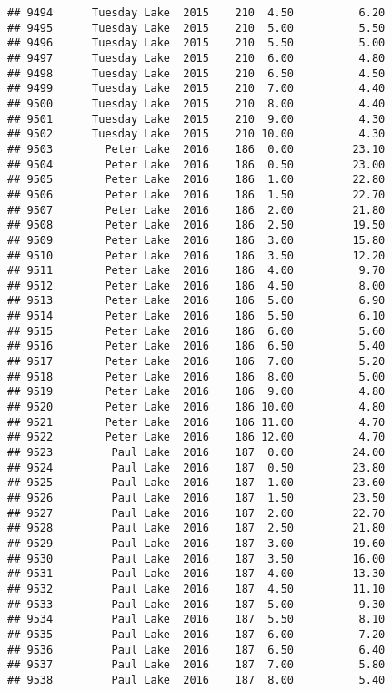 \documentclass[
]{article}
\begin{document}
\begin{verbatim}
## 9494      Tuesday Lake  2015    210  4.50          6.20
## 9495      Tuesday Lake  2015    210  5.00          5.50
## 9496      Tuesday Lake  2015    210  5.50          5.00
## 9497      Tuesday Lake  2015    210  6.00          4.80
## 9498      Tuesday Lake  2015    210  6.50          4.50
## 9499      Tuesday Lake  2015    210  7.00          4.40
## 9500      Tuesday Lake  2015    210  8.00          4.40
## 9501      Tuesday Lake  2015    210  9.00          4.30
## 9502      Tuesday Lake  2015    210 10.00          4.30
## 9503        Peter Lake  2016    186  0.00         23.10
## 9504        Peter Lake  2016    186  0.50         23.00
## 9505        Peter Lake  2016    186  1.00         22.80
## 9506        Peter Lake  2016    186  1.50         22.70
## 9507        Peter Lake  2016    186  2.00         21.80
## 9508        Peter Lake  2016    186  2.50         19.50
## 9509        Peter Lake  2016    186  3.00         15.80
## 9510        Peter Lake  2016    186  3.50         12.20
## 9511        Peter Lake  2016    186  4.00          9.70
## 9512        Peter Lake  2016    186  4.50          8.00
## 9513        Peter Lake  2016    186  5.00          6.90
## 9514        Peter Lake  2016    186  5.50          6.10
## 9515        Peter Lake  2016    186  6.00          5.60
## 9516        Peter Lake  2016    186  6.50          5.40
## 9517        Peter Lake  2016    186  7.00          5.20
## 9518        Peter Lake  2016    186  8.00          5.00
## 9519        Peter Lake  2016    186  9.00          4.80
## 9520        Peter Lake  2016    186 10.00          4.80
## 9521        Peter Lake  2016    186 11.00          4.70
## 9522        Peter Lake  2016    186 12.00          4.70
## 9523         Paul Lake  2016    187  0.00         24.00
## 9524         Paul Lake  2016    187  0.50         23.80
## 9525         Paul Lake  2016    187  1.00         23.60
## 9526         Paul Lake  2016    187  1.50         23.50
## 9527         Paul Lake  2016    187  2.00         22.70
## 9528         Paul Lake  2016    187  2.50         21.80
## 9529         Paul Lake  2016    187  3.00         19.60
## 9530         Paul Lake  2016    187  3.50         16.00
## 9531         Paul Lake  2016    187  4.00         13.30
## 9532         Paul Lake  2016    187  4.50         11.10
## 9533         Paul Lake  2016    187  5.00          9.30
## 9534         Paul Lake  2016    187  5.50          8.10
## 9535         Paul Lake  2016    187  6.00          7.20
## 9536         Paul Lake  2016    187  6.50          6.40
## 9537         Paul Lake  2016    187  7.00          5.80
## 9538         Paul Lake  2016    187  8.00          5.40

\end{verbatim}
\end{document}
